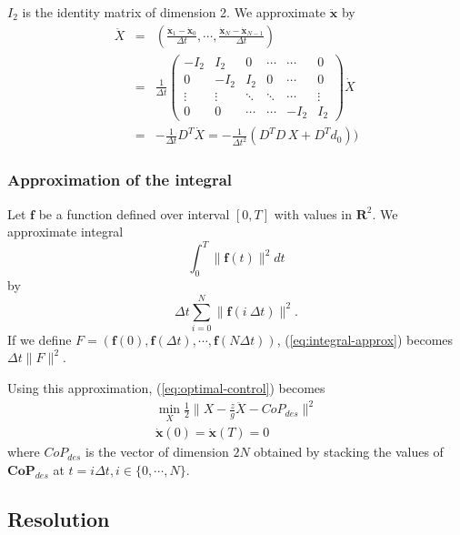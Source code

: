 \documentclass{article}
\newcommand\vect[1]{\mathbf{#1}}
\newcommand\dx{\vect{\dot{x}}}
\newcommand\ddx{\vect{\ddot{x}}}
\begin{document}
$I_2$ is the identity matrix of dimension 2.
We approximate $\ddx$ by
\begin{eqnarray*}
  \ddot{X} &=& \left(\frac{\dx_1-\dx_0}{\Delta t}, \cdots, \frac{\dx_{N}-\dx_{N-1}}{\Delta t}\right)\\
  &=& \frac{1}{\Delta t}\left(\begin{array}{cccccc}
    -I_2   & I_2    & 0      & \cdots & \cdots & 0 \\
    0      & -I_2   & I_2    & 0      & \cdots & 0 \\
    \vdots & \vdots & \ddots & \ddots & \cdots &\vdots \\
    0      & 0      & \cdots & \cdots & -I_2   & I_2
  \end{array}\right) \dot{X} \\
  \label{eq:ddotX}
  &=& -\frac{1}{\Delta t} D^T \dot{X} = -\frac{1}{\Delta t^2} (D^TD\,X + D^Td_0))
\end{eqnarray*}

\subsubsection{Approximation of the integral}

Let $\mathbf{f}$ be a function defined over interval $[0,T]$ with values in $\mathbf{R}^2$. We approximate integral
\begin{equation}
\label{eq:integral}
\int_{0}^{T} \|\mathbf{f}(t)\|^2dt
\end{equation}
by
\begin{equation}\label{eq:integral-approx}
\Delta t \sum_{i=0}^N \|\mathbf{f}(i\ \Delta t)\|^2.
\end{equation}
If we define $F=(\mathbf{f}(0), \mathbf{f}(\Delta t),\cdots,\mathbf{f}(N\Delta t))$, (\ref{eq:integral-approx}) becomes $\Delta t\|F\|^2$.

Using this approximation, (\ref{eq:optimal-control}) becomes
\begin{equation}
  \begin{array}{l}
    \min_{X}\frac{1}{2}\|X - \frac{z}{g}\ddot{X} - CoP_{des}\|^2\\
    \dx(0)=\dx(T)=0
  \end{array}
  \label{eq:optimal-approx}
\end{equation}
where $CoP_{des}$ is the vector of dimension $2N$ obtained by stacking the values of $\vect{CoP}_{des}$ at $t=i\Delta t, i\in\{0,\cdots,N\}$.

\subsection{Resolution}
\end{document}
